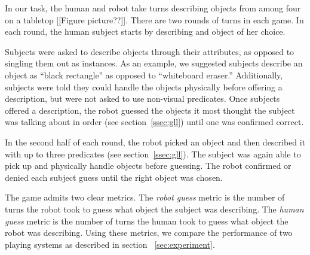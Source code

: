 In our \ispy task, the human and robot take turns describing objects from among four on a tabletop [[Figure picture??]].
There are two rounds of turns in each game. In each round, the human subject starts by describing and object of her choice.

Subjects were asked to describe objects through their attributes, as opposed to singling them out as instances.
As an example, we suggested subjects describe an object as ``black rectangle'' as opposed to ``whiteboard eraser.''
Additionally, subjects were told they could handle the objects physically before offering a description, but were not asked to use non-visual predicates.
Once subjects offered a description, the robot guessed the objects it most thought the subject was talking about in order (see section~\ref{ssec:gll}) until one was confirmed correct.

In the second half of each round, the robot picked an object and then described it with up to three predicates (see section~\ref{ssec:gll}).
The subject was again able to pick up and physically handle objects before guessing.
The robot confirmed or denied each subject guess  until the right object was chosen.

The \ispy game admits two clear metrics.
The \textit{robot guess} metric is the number of turns the robot took to guess what object the subject was describing.
The \textit{human guess} metric is the number of turns the human took to guess what object the robot was describing.
Using these metrics, we compare the performance of two \ispy playing systems as described in section ~\ref{sec:experiment}.